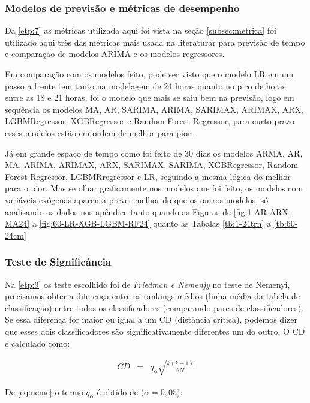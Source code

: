 \subsubsection{Modelos de previs\~ao e m\'etricas de desempenho}\label{subsubsec:modelos}

Da \ref{etp:7} as métricas utilizada aqui foi vista na seção \ref{subsec:metrica} foi utilizado aqui três das métricas mais usada na literaturar para previsão de tempo e comparação de modelos ARIMA e os modelos regressores.

    Em comparação com os modelos feito, pode ser visto que o modelo LR em um passo a frente tem tanto na modelagem de 24 horas quanto no pico de horas entre as 18 e 21 horas, foi o modelo que mais se saiu bem na previsão, logo em sequência os modelos MA, AR, SARIMA, ARIMA, SARIMAX, ARIMAX, ARX, LGBMRegressor, XGBRegressor e Random Forest Regressor, para curto prazo esses modelos estão em ordem de melhor para pior.
    
    Já em grande espaço de tempo como foi feito de 30 dias os modelos ARMA, AR, MA, ARIMA, ARIMAX, ARX, SARIMAX, SARIMA, XGBRegressor, Random Forest Regressor, LGBMRregressor e LR, seguindo a mesma lógica do melhor para o pior. Mas se olhar graficamente nos modelos que foi feito, os modelos com variáveis exógenas aparenta prever melhor do que os outros modelos, só analisando os dados nos apêndice tanto quando as Figuras de \ref{fig:1-AR-ARX-MA24} a \ref{fig:60-LR-XGB-LGBM-RF24} quanto as Tabalas \ref{tb:1-24trn} a \ref{tb:60-24cm}   
    
    \subsubsection{Teste de Signific\^ancia}
    
    Na \ref{etp:9} os teste escolhido foi de \textit{Friedman e Nemenjy} no teste de Nemenyi, precisamos obter a diferença entre os rankings médios (linha média da tabela de classificação) entre todos os classificadores (comparando pares de classificadores). Se essa diferença for maior ou igual a um CD (distância crítica), podemos dizer que esses dois classificadores são significativamente diferentes um do outro. O CD é calculado como:
    
    \begin{eqnarray}
    	C D&=&q_\alpha \sqrt{\frac{k(k+1)}{6 N}}\label{eq:neme}
    \end{eqnarray}

De \eqref{eq:neme} o termo $q_\alpha$ é obtido de ($\alpha=0,05$):

